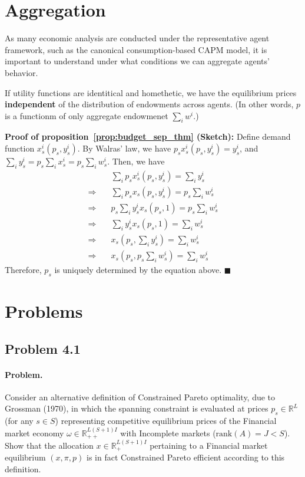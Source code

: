 \section{Aggregation}
As many economic analysis are conducted under the representative agent framework,
such as the canonical consumption-based CAPM model, 
it is important to understand under what conditions we can aggregate agents' behavior.

\begin{tcolorbox}
  \begin{proposition}
    \label{prop:budget_sep_thm}
    If utility functions are identitical and homethetic, we have the equilibrium prices \textbf{independent} 
    of the distribution of endowments across agents.
    (In other words, $p$ is a functionm of only aggregate endowmenet $\sum_i w^i$.)
  \end{proposition}
\end{tcolorbox}

\noindent \textbf{Proof of proposition~\ref{prop:budget_sep_thm} (Sketch):}
Define demand function $x_s^i(p_s, y_s^i)$.
By Walras' law, we have $p_s x_s^i(p_s, y_s^i) = y_s^i$, and $\sum_i y_s^i = p_s \sum_i x^i_s = p_s \sum_i w^i_s$.
Then, we have
\begin{align*}
  & \sum_i p_s x_s^i(p_s, y_s^i) = \sum_i y_s^i \\
  \Rightarrow \quad & \sum_i p_s x_s(p_s, y_s^i)  = p_s \sum_i w^i_s \\
  \Rightarrow \quad & p_s \sum_i  y_s^i x_s(p_s, 1) = p_s \sum_i w^i_s \\
  \Rightarrow \quad & \sum_i y_s^i x_s(p_s, 1) =  \sum_i w^i_s \\
  \Rightarrow \quad &  x_s(p_s, \sum_i y_s^i) =  \sum_i w^i_s \\
  \Rightarrow \quad  &  x_s(p_s, p_s \sum_i w^i_s) =  \sum_i w^i_s
\end{align*}
Therefore, $p_s$ is uniquely determined by the equation above. \(\blacksquare\)


\section{Problems}
\subsection{Problem 4.1}
\paragraph{Problem.} Consider an alternative definition of Constrained Pareto optimality, due to Grossman (1970), in which the spanning constraint is evaluated at prices $p_s \in \mathbb{R}^L$ (for any $s \in S$) representing competitive equilibrium prices of the Financial market economy $\omega \in \mathbb{R}_{++}^{L(S+1)I}$ with Incomplete markets ($\text{rank}(A) = J < S$). Show that the allocation $x \in \mathbb{R}_+^{L(S+1)I}$ pertaining to a Financial market equilibrium $(x, \pi, p)$ is in fact Constrained Pareto efficient according to this definition.

